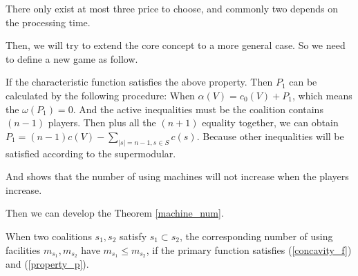 There only exist at most three price to choose, and commonly two depends on the processing time.


Then, we will try to extend the core concept to a more general case. So we need to define a new game as follow.



If the characteristic function satisfies the above property. Then $ P_1$ can be calculated by the following procedure:
When $\alpha(V) = c_0(V) + P_1$, which means the $\omega(P_1) = 0$. And the active inequalities must be the coalition contains $(n-1)$ players.
Then plus all the $(n+1)$ equality together, we can obtain $P_1 = (n-1)c(V)- \sum_{|s|=n-1,s\in S}c(s)$.
Because other inequalities will be satisfied according to the supermodular.

And shows that the number of using machines will not increase when the players increase.

Then we can develop the Theorem \ref{machine_num}.

\begin{thm}\label{machine_num}
When two coalitions $s_1,s_2$ satisfy $s_1 \subset s_2$, the corresponding number of using facilities $ m_{s_1}, m_{s_2}$ have $m_{s_1} \leq m_{s_2}$, if the primary function satisfies  (\ref{concavity_f}) and (\ref{property_p}).
\end{thm}
